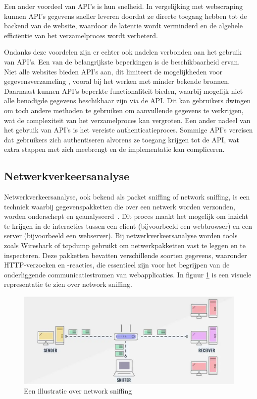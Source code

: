Een ander voordeel van API's is hun snelheid. In vergelijking met webscraping kunnen API's gegevens sneller leveren doordat ze directe toegang hebben tot de backend van de website, waardoor de latentie wordt verminderd en de algehele efficiëntie van het verzamelproces wordt verbeterd.

\vspace{5mm} %

Ondanks deze voordelen zijn er echter ook nadelen verbonden aan het gebruik van API's. Een van de belangrijkste beperkingen is de beschikbaarheid ervan. Niet alle websites bieden API's aan, dit limiteert de mogelijkheden voor gegevensverzameling , vooral bij het werken met minder bekende bronnen.
Daarnaast kunnen API's beperkte functionaliteit bieden, waarbij mogelijk niet alle benodigde gegevens beschikbaar zijn via de API. Dit kan gebruikers dwingen om toch andere methoden te gebruiken om aanvullende gegevens te verkrijgen, wat de complexiteit van het verzamelproces kan vergroten.
Een ander nadeel van het gebruik van API's is het vereiste authenticatieproces. Sommige API's vereisen dat gebruikers zich authentiseren alvorens ze toegang krijgen tot de API, wat extra stappen met zich meebrengt en de implementatie kan compliceren.

\subsection{Netwerkverkeersanalyse}
Netwerkverkeersanalyse, ook bekend als packet sniffing of network sniffing, is een techniek waarbij gegevenspakketten die over een netwerk worden verzonden, worden onderschept en geanalyseerd~\autocite{Chapple2018}. Dit proces maakt het mogelijk om inzicht te krijgen in de interacties tussen een client (bijvoorbeeld een webbrowser) en een server (bijvoorbeeld een webserver).
Bij netwerkverkeersanalyse worden tools zoals Wireshark of tcpdump gebruikt om netwerkpakketten vast te leggen en te inspecteren. Deze pakketten bevatten verschillende soorten gegevens, waaronder HTTP-verzoeken en -reacties, die essentieel zijn voor het begrijpen van de onderliggende communicatiestromen van webapplicaties. In figuur \ref{fig:networksniffing} is een visuele representatie te zien over network sniffing.
\begin{figure}[h]
    \centering
    \includegraphics[width=\linewidth]{graphics/networksniffing.png}
    \caption{Een illustratie over network sniffing}
    \label{fig:networksniffing}
\end{figure}

